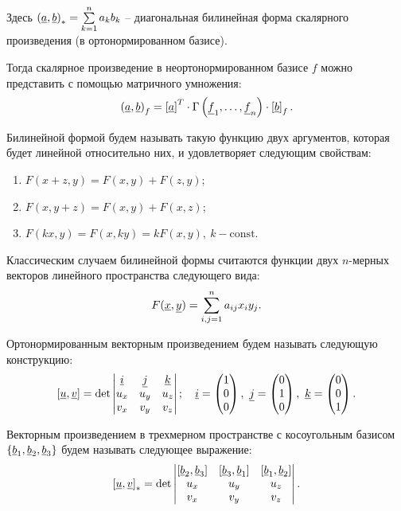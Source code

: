 	Здесь \( \left( \underline{a}, \underline{b} \right)_* = \sum\limits_{k=1}^n a_k b_k \) -- диагональная билинейная форма скалярного произведения (в ортонормированном базисе).

	Тогда скалярное произведение в неортонормированном базисе $f$ можно представить с помощью матричного умножения:
	\[ \left( \underline{a}, \underline{b} \right)_{f} = \left[ \underline{a} \right]^{T} \cdot \Gamma\left( \underline{f}_1, \dots, \underline{f}_n \right) \cdot \left[ \underline{b} \right]_f. \]

	Билинейной формой будем называть такую функцию двух аргументов, которая будет линейной относительно них, и удовлетворяет следующим свойствам:
	\begin{enumerate}
		\item \( F(x + z, y) = F(x, y) + F(z, y) \);
		\item \( F(x, y + z) = F(x, y) + F(x, z) \);
		\item \( F(kx, y) = F(x, ky) = k F(x, y), ~ k - \mathrm{const} \).
	\end{enumerate}

	Классическим случаем билинейной формы считаются функции двух $n$-мерных векторов линейного пространства следующего вида:
	\[ F(\underline{x}, \underline{y}) = \sum_{i, j=1}^{n} a_{ij} x_i y_j.  \]

	Ортонормированным векторным произведением будем называть следующую конструкцию:
	\[ 
		\left[ \underline{u}, \underline{v} \right] = \det\begin{vmatrix} \underline{i} & \underline{j} & \underline{k} \\ u_x & u_y & u_z \\ v_x & v_y & v_z \end{vmatrix}; 
		\quad \underline{i} = \begin{pmatrix} 1 \\ 0 \\ 0 \end{pmatrix}, 
		~ \underline{j} = \begin{pmatrix} 0 \\ 1 \\ 0 \end{pmatrix}, 
		~ \underline{k} = \begin{pmatrix} 0 \\ 0 \\ 1 \end{pmatrix}. 
	\]

	Векторным произведением в трехмерном пространстве с косоугольным базисом \( \left\lbrace \underline{b}_1, \underline{b}_2, \underline{b}_3 \right\rbrace \) будем называть следующее выражение:
	\[ 
		\left[ \underline{u}, \underline{v} \right]_{*} = \det\begin{vmatrix} \left[ \underline{b}_2, \underline{b}_3 \right] & \left[ \underline{b}_3, \underline{b}_1 \right] & \left[ \underline{b}_1, \underline{b}_2 \right] \\ u_x & u_y & u_z \\ v_x & v_y & v_z \end{vmatrix}.
	\]

